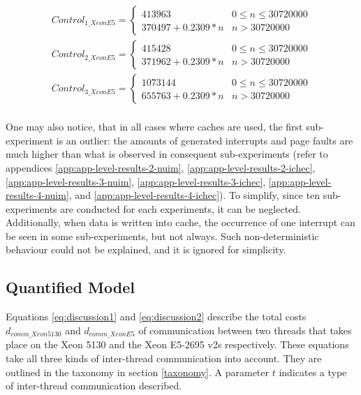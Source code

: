 \begin{equation}\label{eq:discussion8000}
\begin{split}
Control_{1\_XeonE5} = \begin{cases}413963 & 0 \leq n \leq 30720000 \\ 370497 + 0.2309 * n & n > 30720000\end{cases} \\
Control_{2\_XeonE5} = \begin{cases}415428 & 0 \leq n \leq 30720000 \\ 371962 +  0.2309 * n & n > 30720000\end{cases} \\
Control_{3\_XeonE5} = \begin{cases}1073144 & 0 \leq n \leq 30720000 \\ 655763 +  0.2309 * n & n > 30720000\end{cases} \\
\end{split}
\end{equation}

One may also notice, that in all cases where caches are used, the first sub-experiment is an outlier: the amounts of generated interrupts and page faults are much higher than what is observed in consequent sub-experiments (refer to appendices \ref{app:app-level-results-2-nuim}, \ref{app:app-level-results-2-ichec}, \ref{app:app-level-results-3-nuim}, \ref{app:app-level-results-3-ichec}, \ref{app:app-level-results-4-nuim}, and \ref{app:app-level-results-4-ichec}). To simplify, since ten sub-experiments are conducted for each experiments, it can be neglected. Additionally, when data is written into cache, the occurrence of one interrupt can be seen in some sub-experiments, but not always. Such non-deterministic behaviour could not be explained, and it is ignored for simplicity.

\subsection{Quantified Model}

Equations \ref{eq:discussion1} and \ref{eq:discussion2} describe the total costs $d_{comm\_Xeon5130}$ and $d_{comm\_XeonE5}$ of communication between two threads that takes place on the Xeon 5130 and the Xeon E5-2695 v2s respectively. These equations take all three kinds of inter-thread communication into account. They are outlined in the taxonomy in section \ref{taxonomy}. A parameter $t$ indicates a type of inter-thread communication described.

